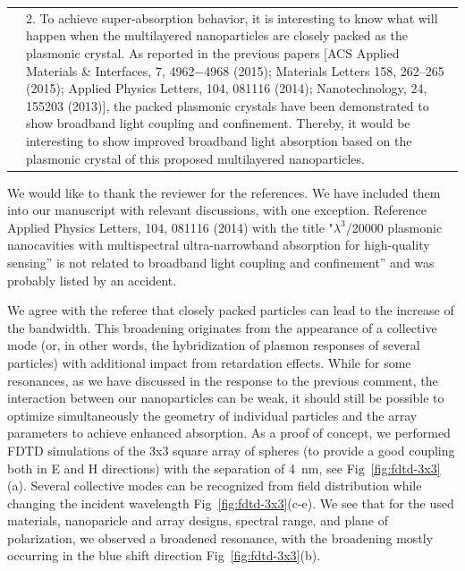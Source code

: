 \documentclass[a4paper]{article}
\begin{document}
\begin{tabular}[!H]{l|p{}}
  \quad & 2. To achieve super-absorption behavior, it is interesting
  to know what will happen when the multilayered nanoparticles are
  closely packed as the plasmonic crystal. As reported in the previous
  papers [ACS Applied Materials \& Interfaces, 7, 4962−4968 (2015);
  Materials Letters 158, 262–265 (2015); Applied Physics Letters, 104,
  081116 (2014); Nanotechnology, 24, 155203 (2013)], the packed
  plasmonic crystals have been demonstrated to show broadband light
  coupling and confinement. Thereby, it would be interesting to show
  improved broadband light absorption based on the plasmonic crystal
  of this proposed multilayered nanoparticles. 
\end{tabular}

We would like to thank the reviewer for the references. We have
included them into our manuscript with relevant discussions,
with one exception. Reference Applied Physics Letters, 104, 081116
(2014) with the title "$\lambda^3$/20000 plasmonic nanocavities with
multispectral ultra-narrowband absorption for high-quality sensing''
is not related to broadband light coupling and confinement'' and was
probably listed by an accident.

We agree with the referee that closely packed particles can lead to
the increase of the bandwidth. This broadening originates from the
appearance of a collective mode (or, in other words, the hybridization
of plasmon responses of several particles) with additional impact from
retardation effects. While for some resonances, as we have discussed
in the response to the previous comment, the interaction between our
nanoparticles can be weak, it should still be possible to optimize
simultaneously the geometry of individual particles and the array
parameters to achieve enhanced absorption. As a proof of concept, we
performed FDTD simulations of the 3x3 square array of spheres (to
provide a good coupling both in E and H directions) with the
separation of 4~nm, see Fig~\ref{fig:fdtd-3x3}(a). Several collective
modes can be recognized from field distribution while changing the
incident wavelength Fig~\ref{fig:fdtd-3x3}(c-e). We see that for the
used materials, nanoparicle and array designs, spectral range, and
plane of polarization, we observed a broadened resonance, with the
broadening mostly occurring in the blue shift direction
Fig~\ref{fig:fdtd-3x3}(b).
\end{document}
